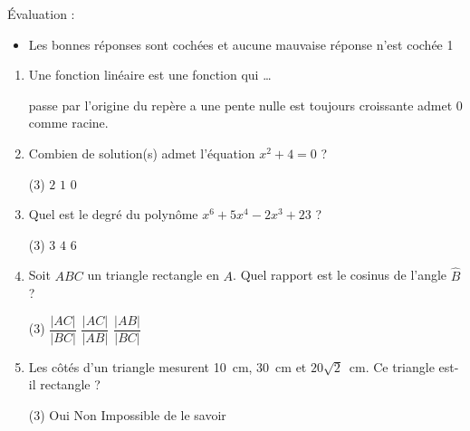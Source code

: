 %
%
    Évaluation :
    \begin{itemize}
        \item Les bonnes réponses sont cochées et aucune mauvaise réponse n'est cochée \hfill 1
    \end{itemize}
    \begin{enumerate}
        \item Une fonction linéaire est une fonction qui \dots
              \begin{QCM}
                  \choice[\faCheckSquare] passe par l'origine du repère
                  \choice a une pente nulle
                  \choice est toujours croissante
                  \choice[\faCheckSquare] admet $0$ comme racine.
              \end{QCM}
        \item Combien de solution(s) admet l'équation $x^2+4=0$ ?
              \begin{QCM}(3)
                  \choice $2$
                  \choice $1$
                  \choice[\faCheckSquare] $0$
              \end{QCM}
        \item Quel est le degré du polynôme $x^6 + 5x^4 -2x^3 +23$ ?
              \begin{QCM}(3)
                  \choice $3$
                  \choice $4$
                  \choice[\faCheckSquare] $6$
              \end{QCM}
        \item Soit $ABC$ un triangle rectangle en $A$. Quel rapport est le cosinus de l'angle $\widehat{B}$ ?
              \begin{QCM}(3)
                  \choice $\dfrac{|AC|}{|BC|}$
                  \choice $\dfrac{|AC|}{|AB|}$
                  \choice[\faCheckSquare] $\dfrac{|AB|}{|BC|}$
              \end{QCM}
        \item Les côtés d'un triangle mesurent \SI{10}{cm}, \SI{30}{cm} et $20\sqrt{2}$~cm. Ce triangle est-il rectangle ?
              \begin{QCM}(3)
                  \choice[\faCheckSquare] Oui
                  \choice Non
                  \choice Impossible de le savoir
              \end{QCM}
    \end{enumerate}
